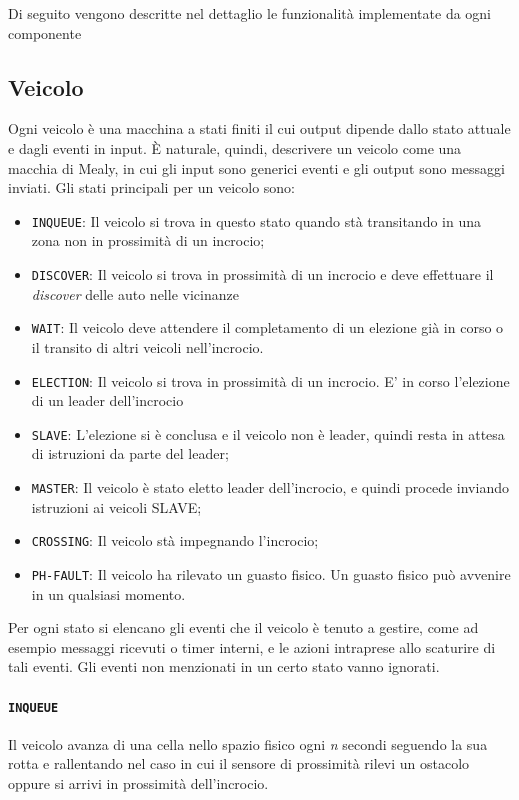 \documentclass{memoir}
\begin{document}
Di seguito vengono descritte nel dettaglio le funzionalità implementate da ogni componente
\subsection{Veicolo}
Ogni veicolo è una macchina a stati finiti il cui output dipende dallo stato
attuale e dagli eventi in input. È naturale, quindi, descrivere un veicolo come
una macchia di Mealy, in cui gli input sono generici eventi e gli output sono
messaggi inviati. Gli stati principali per un veicolo sono:
\begin{itemize}
\item \texttt{INQUEUE}: Il veicolo si trova in questo stato quando stà
  transitando in una zona non in prossimità di un incrocio;
\item \texttt{DISCOVER}: Il veicolo si trova in prossimità di un incrocio e deve
  effettuare il \emph{discover} delle auto nelle vicinanze
\item \texttt{WAIT}: Il veicolo deve attendere il completamento di un elezione
  già in corso o il transito di altri veicoli nell'incrocio.
\item \texttt{ELECTION}: Il veicolo si trova in prossimità di un incrocio. E' in
  corso l'elezione di un leader dell'incrocio
\item \texttt{SLAVE}: L'elezione si è conclusa e il veicolo non è leader, quindi
  resta in attesa di istruzioni da parte del leader;
\item \texttt{MASTER}: Il veicolo è stato eletto leader dell'incrocio, e quindi
  procede inviando istruzioni ai veicoli SLAVE;
\item \texttt{CROSSING}: Il veicolo stà impegnando l'incrocio;
\item \texttt{PH-FAULT}: Il veicolo ha rilevato un guasto fisico. Un guasto
  fisico può avvenire in un qualsiasi momento.
\end{itemize}

Per ogni stato si elencano gli eventi che il veicolo è tenuto a gestire, come ad
esempio messaggi ricevuti o timer interni, e le azioni intraprese allo scaturire
di tali eventi. Gli eventi non menzionati in un certo stato vanno ignorati.

\paragraph{\texttt{INQUEUE}}
Il veicolo avanza di una cella nello spazio fisico ogni \emph{n} secondi
seguendo la sua rotta e rallentando nel caso in cui il sensore di prossimità
rilevi un ostacolo oppure si arrivi in prossimità dell'incrocio.
\end{document}
